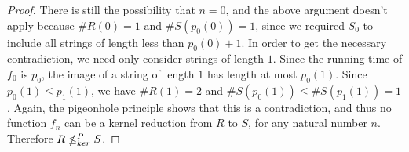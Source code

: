 \begin{proof}
  There is still the possibility that $n = 0$, and the above argument doesn't apply because $\#R(0) = 1$ and $\#S(p_0(0)) = 1$, since we required $S_0$ to include all strings of length less than $p_0(0) + 1$.
  In order to get the necessary contradiction, we need only consider strings of length $1$.
  Since the running time of $f_0$ is $p_0$, the image of a string of length $1$ has length at most $p_0(1)$.
  Since $p_0(1) \leq p_1(1)$, we have $\#R(1) = 2$ and $\#S(p_0(1)) \leq \#S(p_1(1)) = 1$.
  Again, the pigeonhole principle shows that this is a contradiction, and thus no function $f_n$ can be a kernel reduction from $R$ to $S$, for any natural number $n$.
  Therefore $R \nleq^{P}_{ker} S$.
\end{proof}
